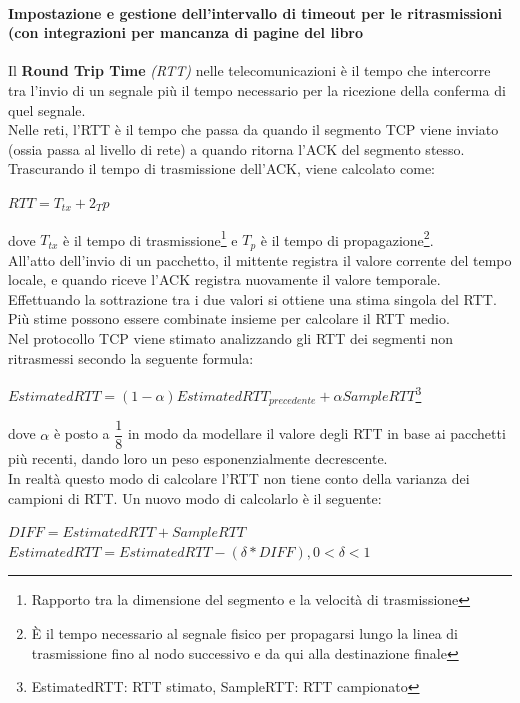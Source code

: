\documentclass[11pt,a4paper]{book}
\begin{document}
\paragraph{Impostazione e gestione dell'intervallo di timeout per le ritrasmissioni (con integrazioni per mancanza di pagine del libro}
Il \textbf{Round Trip Time} \textit{(RTT)} nelle telecomunicazioni è il tempo che intercorre tra l'invio di un segnale più il tempo necessario per la ricezione della conferma di quel segnale. \\
Nelle reti, l'RTT è il tempo che passa da quando il segmento TCP viene inviato (ossia passa al livello di rete) a quando ritorna l'ACK del segmento stesso. Trascurando il tempo di trasmissione dell'ACK, viene calcolato come:
\begin{center}
	$RTT = T_{tx} + 2_T{p}$
\end{center}
dove $T_{tx}$ è il tempo di trasmissione\footnote{Rapporto tra la dimensione del segmento e la velocità di trasmissione} e $T_{p}$ è il tempo di propagazione\footnote{È il tempo necessario al segnale fisico per propagarsi lungo la linea di trasmissione fino al nodo successivo e da qui alla destinazione finale}. \\
All'atto dell'invio di un pacchetto, il mittente registra il valore corrente del tempo locale, e quando riceve l'ACK registra nuovamente il valore temporale. Effettuando la sottrazione tra i due valori si ottiene una stima singola del RTT. Più stime possono essere combinate insieme per calcolare il RTT medio. \\
Nel protocollo TCP viene stimato analizzando gli RTT dei segmenti non ritrasmessi secondo la seguente formula:
\begin{center}
	$EstimatedRTT = (1-\alpha )EstimatedRTT_{precedente} + \alpha SampleRTT$\footnote{EstimatedRTT: RTT stimato, SampleRTT: RTT campionato}
\end{center}
dove $\alpha$ è posto a $\dfrac{1}{8}$ in modo da modellare il valore degli RTT in base ai pacchetti più recenti, dando loro un peso esponenzialmente decrescente. \\
In realtà questo modo di calcolare l'RTT non tiene conto della varianza dei campioni di RTT. Un nuovo modo di calcolarlo è il seguente:
\begin{center}
	$DIFF = EstimatedRTT + SampleRTT$
	$EstimatedRTT = EstimatedRTT - (\delta*DIFF), 0 < \delta < 1$
\end{center}
\end{document}
